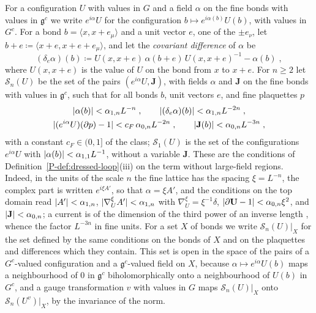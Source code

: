 For a configuration $U$ with values in $G$ and a field $\alpha$ on the fine bonds with values in $\mathfrak g^c$ we write $e^{i\alpha}U$ for the configuration $b \mapsto e^{i\alpha(b)}U(b)$, with values in $G^c$. For a bond $b = \langle x, x + e_\mu\rangle$ and a unit vector $e$, one of the $\pm e_\nu$, let $b + e \coloneqq \langle x + e, x + e + e_\mu\rangle$, and let the \emph{covariant difference} of $\alpha$ be
\begin{equation}\label{eq:covariant-difference}
    (\delta_e\alpha)(b) \coloneqq U(x, x + e)\,\alpha(b + e)\,U(x, x + e)^{-1} - \alpha(b)\;,
\end{equation}
where $U(x, x + e)$ is the value of $U$ on the bond from $x$ to $x + e$. For $n \geq 2$ let $\mathcal S_n(U)$ be the set of the pairs $(e^{i\alpha}U, \mathbf J)$, with fields $\alpha$ and $\mathbf J$ on the fine bonds with values in $\mathfrak g^c$, such that for all bonds $b$, unit vectors $e$, and fine plaquettes $p$
\begin{equation}\label{eq:space-of-step}
\begin{gathered}
    \lvert\alpha(b)\rvert < \alpha_{1,n}L^{-n}\;,
    \qquad
    \lvert(\delta_e\alpha)(b)\rvert < \alpha_{1,n}L^{-2n}\;,\\
    \lvert(e^{i\alpha}U)(\partial p) - 1\rvert < c_F\,\alpha_{0,n}L^{-2n}\;,
    \qquad
    \lvert\mathbf J(b)\rvert < \alpha_{0,n}L^{-3n}\;,
\end{gathered}
\end{equation}
with a constant $c_F \in (0, 1]$ of the class; $\mathcal S_1(U)$ is the set of the configurations $e^{i\alpha}U$ with $\lvert\alpha(b)\rvert < \alpha_{1,1}L^{-1}$, without a variable $\mathbf J$. These are the conditions of Definition~\ref{P-def:dressed-loop}(iii) on the term without large-field regions. Indeed, in the units of the scale $n$ the fine lattice has the spacing $\xi = L^{-n}$, the complex part is written $e^{i\xi A'}$, so that $\alpha = \xi A'$, and the conditions \cite[(2.39), (2.34), (2.36), p.~261]{BalabanCRE} on the top domain read $\lvert A'\rvert < \alpha_{1,n}$, $\lvert\nabla^\xi_UA'\rvert < \alpha_{1,n}$ with $\nabla^\xi_U = \xi^{-1}\delta$, $\lvert\partial\mathbf U - 1\rvert < \alpha_{0,n}\xi^2$, and $\lvert\mathbf J\rvert < \alpha_{0,n}$; a current is of the dimension of the third power of an inverse length \cite[(1.8), p.~261]{BalabanRG1}, whence the factor $L^{-3n}$ in fine units. For a set $X$ of bonds we write $\mathcal S_n(U)|_X$ for the set defined by the same conditions on the bonds of $X$ and on the plaquettes and differences which they contain. This set is open in the space of the pairs of a $G^c$-valued configuration and a $\mathfrak g^c$-valued field on $X$, because $\alpha \mapsto e^{i\alpha}U(b)$ maps a neighbourhood of $0$ in $\mathfrak g^c$ biholomorphically onto a neighbourhood of $U(b)$ in $G^c$, and a gauge transformation $v$ with values in $G$ maps $\mathcal S_n(U)|_X$ onto $\mathcal S_n(U^v)|_X$, by the invariance of the norm.

